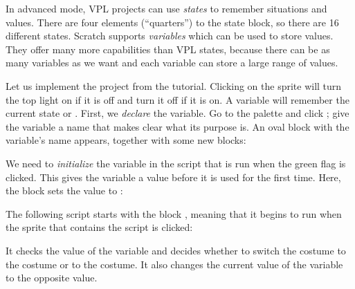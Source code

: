 \label{ch.variables}


In advanced mode, VPL projects can use \emph{states} to remember
situations and values. There are four elements (``quarters'') to the
state block, so there are 16 different states. Scratch supports
\emph{variables} which can be used to store values. They offer many more
capabilities than VPL states, because there can be as many variables as
we want and each variable can store a large range of values.


Let us implement the project  from the tutorial. Clicking
on the  sprite will turn the top light on if it is off and turn it
off if it is on. A variable will remember the current state 
or . First, we \emph{declare} the variable. Go to the 
palette and click ; give the variable a name that
makes clear what its purpose is. An oval block with
the variable's name appears, together with some new blocks:



We need to \emph{initialize} the variable in the script that is
run when the green flag is clicked. This gives the variable a
value before it is used for the first time. Here, the block
 sets the value to :


The following script starts with the block ,
meaning that it begins to run when the sprite that contains the script is clicked:
 

It checks the value of the variable  and decides whether to
switch the costume to the  costume or to the  costume. It also
changes the current value of the variable  to the opposite
value.







